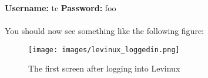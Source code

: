 \documentclass[12pt, a4paper, twoside]{book}
\newcommand{\blank}[1]{\hspace*{#1}}
\begin{document}
\begin{framed}
    \textbf{Username:} tc\blank{2cm} \textbf{Password:} foo
\end{framed}

\paragraph{} You should now see something like the following figure:

\begin{figure}[H]
\centering
\texttt{[image: images/levinux\_loggedin.png]}
\caption{The first screen after logging into Levinux}
\label{fig:levinux-logged-in}
\end{figure}


\end{document}
